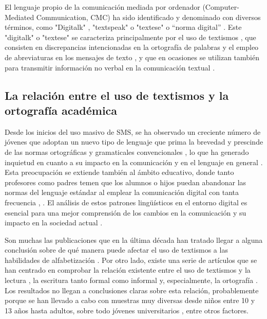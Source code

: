 \documentclass[spanish]{textolivre}
\begin{document}
El lenguaje propio de la comunicación mediada por ordenador (Computer-Mediated Communication, CMC) ha sido identificado y denominado con diversos términos, como "Digitalk" \cite[p. 67]{chalak_linguistic_2017}, "textspeak" o "textese" \cite[p. 583]{verheijen_effects_2013} o “norma digital” \cite[p. 61]{gomez-camacho_youth_2023b}. Este "digitalk" o "textese" se caracteriza principalmente por el uso de textismos \cite[p. 7]{burrell_playful_2022}, que consisten en discrepancias intencionadas en la ortografía de palabras y el empleo de abreviaturas en los mensajes de texto \cite{bernicot2014skilled}, y que en ocasiones se utilizan también para transmitir información no verbal en la comunicación textual \cite{adams2023examining}.


\subsection{La relación entre el uso de textismos y la ortografía académica}

Desde los inicios del uso masivo de SMS, se ha observado un creciente número de jóvenes que adoptan un nuevo tipo de lenguaje que prima la brevedad y prescinde de las normas ortográficas y gramaticales convencionales \cite[p. 583]{verheijen_effects_2013}, lo que ha generado inquietud en cuanto a su impacto en la comunicación y en el lenguaje en general \cite[p. 251]{drouin_texting_2014}. Esta preocupación se extiende también al ámbito educativo, donde tanto profesores como padres temen que los alumnos o hijos puedan abandonar las normas del lenguaje estándar al emplear la comunicación digital con tanta frecuencia \cite[p. 16]{totanes_textese_2019}, \cite[p. 112]{verheijen_orthographic_2018}. El análisis de estos patrones lingüísticos en el entorno digital es esencial para una mejor comprensión de los cambios en la comunicación y su impacto en la sociedad actual \cite{adams2023examining}.

Son muchas las publicaciones que en la última década han tratado llegar a alguna conclusión sobre de qué manera puede afectar el uso de textismos a las habilidades de alfabetización \cite{de_jonge_textmessage_2012,drouin_college_2011,grace_undergraduates_2014,ouellette_generation_2016,plester_exploring_2009,van_dijk_influence_2016,wood_longitudinal_2011a}. Por otro lado, existe una serie de artículos que se han centrado en comprobar la relación existente entre el uso de textismos y la lectura \cite{coe_txtn_2011}, la escritura tanto formal como informal \cite{rosen_relationship_2010,torrado_cespon_uso_2015} y, especialmente, la ortografía \cite{bernicot2014skilled,bushnell_text-messaging_2011,gomez_camacho_norma_2017,lanchantin_good_2014,powell_does_2011,wood_effect_2011b}. Los resultados no llegan a conclusiones claras sobre esta relación, probablemente porque se han llevado a cabo con muestras muy diversas desde niños entre 10 y 13 años \cite{van_dijk_influence_2016} hasta adultos, sobre todo jóvenes universitarios \cite{drouin_texting_2014,grace_text_2015,hunt-gomez_textisms_2020,kemp_university_2017,lyddy_analysis_2014}, entre otros factores. 
\end{document}
